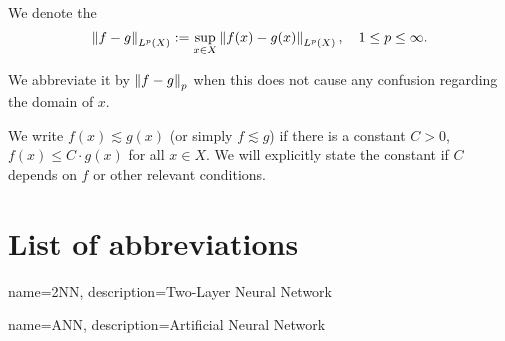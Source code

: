 We denote the 
\begin{equation*}
    \left\| f - g \right\|_{L^{p}(X)} := 
    \sup_{x \in X} \left\| f(x) - g(x) \right\|_{L^{p}(X)}, \quad 1 \leq p \leq \infty.
\end{equation*}

We abbreviate it by $\left\| f - g \right\|_{p}$ when this does not cause any confusion
regarding the domain of $x$.

We write $f(x) \lesssim g(x)$ (or simply $f \lesssim g$) if there is a constant
$C>0$, $f(x) \leq C \cdot g(x)$ for all $x \in X$. We will explicitly state the
constant if $C$ depends on $f$ or other relevant conditions.

\section*{List of abbreviations}

\printglossary

{
    name=2NN,
    description={Two-Layer Neural Network}
}

{
    name=ANN,
    description={Artificial Neural Network}
}





